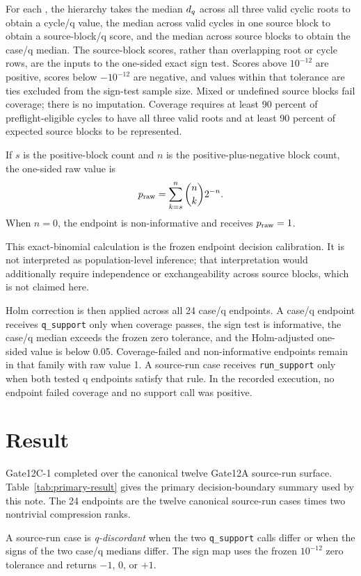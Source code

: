 \documentclass[11pt]{article}
\newcommand{\code}[1]{\texttt{\detokenize{#1}}}
\newcommand{\breakcode}[1]{\begingroup\urlstyle{tt}\nolinkurl{#1}\endgroup}
\begin{document}
For each \code{q}, the hierarchy takes the median \(d\sb q\) across all three
valid cyclic roots to obtain a cycle/q value, the median across valid cycles in
one source block to obtain a source-block/q score, and the median across source
blocks to obtain the case/q median. The source-block scores, rather than
overlapping root or cycle rows, are the inputs to the one-sided exact sign test.
Scores above \(10^{-12}\) are positive, scores below \(-10^{-12}\) are
negative, and values within that tolerance are ties excluded from the sign-test
sample size. Mixed or undefined source blocks fail coverage; there is no
imputation. Coverage requires at least 90 percent of preflight-eligible cycles
to have all three valid roots and at least 90 percent of expected source blocks
to be represented.

If \(s\) is the positive-block count and \(n\) is the positive-plus-negative
block count, the one-sided raw value is
\[
p\sb{\mathrm{raw}}=\sum\sb{k=s}^{n}\binom{n}{k}2^{-n}.
\]
When \(n=0\), the endpoint is non-informative and receives
\(p\sb{\mathrm{raw}}=1\).

This exact-binomial calculation is the frozen endpoint decision calibration.
It is not interpreted as population-level inference; that interpretation would
additionally require independence or exchangeability across source blocks,
which is not claimed here.

Holm correction is then applied across all 24 case/q endpoints. A case/q
endpoint receives \breakcode{q_support} only when coverage passes, the sign test is
informative, the case/q median exceeds the frozen zero tolerance, and the
Holm-adjusted one-sided value is below 0.05. Coverage-failed and non-informative
endpoints remain in that family with raw value 1. A source-run case receives
\breakcode{run_support} only when both tested q endpoints satisfy that rule. In the
recorded execution, no endpoint failed coverage and no support call was
positive.

\section{Result}
\label{sec:result}

Gate12C-1 completed over the canonical twelve Gate12A source-run surface.
Table~\ref{tab:primary-result} gives the primary decision-boundary summary used
by this note. The 24 endpoints are the twelve canonical source-run cases times
two nontrivial compression ranks.

A source-run case is \emph{q-discordant} when the two \breakcode{q_support} calls
differ or when the signs of the two case/q medians differ. The sign map uses the
frozen \(10^{-12}\) zero tolerance and returns \(-1\), \(0\), or \(+1\).
\end{document}
